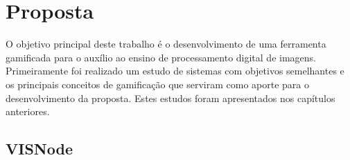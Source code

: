 \documentclass[
	12pt,				%
	oneside,			%
	a4paper,			%
	english,			%
	french,				%
	spanish,			%
	brazil,				%
	]{abntex2}
\begin{document}
\chapter{Proposta} 

	O objetivo principal deste trabalho é o desenvolvimento de uma ferramenta gamificada para o auxílio ao ensino de processamento digital de imagens. Primeiramente foi realizado um estudo de sistemas com objetivos semelhantes e os principais conceitos de gamificação que serviram como aporte para o desenvolvimento da proposta. Estes estudos foram apresentados nos capítulos anteriores.
    
\section{VISNode}
\end{document}
